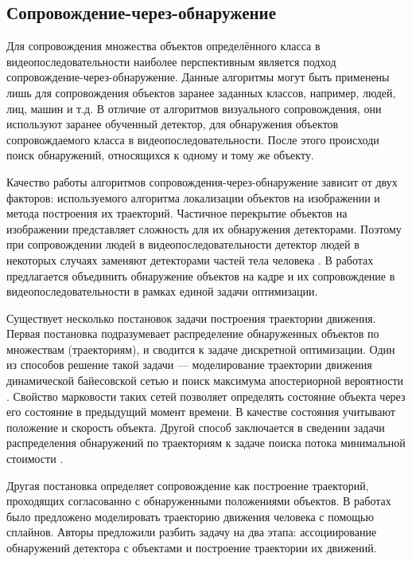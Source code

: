 \subsection{Сопровождение-через-обнаружение}

Для сопровождения множества объектов определённого класса в видеопоследовательности наиболее перспективным является подход сопровождение-через-обнаружение. Данные алгоритмы могут быть применены лишь для сопровождения объектов заранее заданных классов, например, людей, лиц, машин и т.д. В отличие от алгоритмов визуального сопровождения, они используют заранее обученный детектор, для обнаружения объектов сопровождаемого класса в видеопоследовательности. После этого происходи поиск обнаружений, относящихся к одному и тому же объекту.

Качество работы алгоритмов сопровождения-через-обнаружение зависит от двух факторов: используемого алгоритма локализации объектов на изображении и метода построения их траекторий. Частичное перекрытие объектов на изображении представляет сложность для их обнаружения детекторами. Поэтому при сопровождении людей в видеопоследовательности детектор людей в некоторых случаях заменяют детекторами частей тела человека \cite{izadinia20122t}. В работах \cite{wu2012coupling,yan2012track} предлагается объединить обнаружение объектов на кадре и их сопровождение в видеопоследовательности в рамках единой задачи оптимизации.

Существует несколько постановок задачи построения траектории движения. Первая постановка подразумевает распределение обнаруженных объектов по множествам (траекториям), и сводится к задаче дискретной оптимизации. Один из способов решение такой задачи --- моделирование траектории движения динамической байесовской сетью и поиск максимума апостериорной вероятности \cite{yoon2012visual,benfold2011stable,izadinia20122t,choi2012unified}. Свойство марковости таких сетей позволяет определять состояние объекта через его состояние в предыдущий момент времени. В качестве состояния учитывают положение и скорость объекта. Другой способ заключается в сведении задачи распределения обнаружений по траекториям к задаче поиска потока минимальной стоимости \cite{leal2011everybody,butt2013multi}.

Другая постановка определяет сопровождение как построение траекторий, проходящих согласованно с обнаруженными положениями объектов. В работах \cite{andriyenko2012discrete,milan2013detection} было предложено моделировать траекторию движения человека с помощью сплайнов. Авторы предложили разбить задачу на два этапа: ассоциирование обнаружений детектора с объектами и построение траектории их движений.

